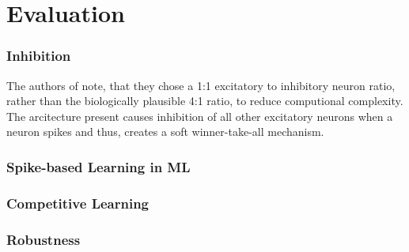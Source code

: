 \section{Evaluation}
\label{sec:evaluation}

\subsubsection{Inhibition}
The authors of \cite{SNN} note, that they chose a 1:1 excitatory to inhibitory neuron ratio, rather than the biologically plausible 4:1 ratio, 
to reduce computional complexity.
The arcitecture present causes inhibition of all other excitatory neurons when a neuron spikes and thus, 
creates a soft winner-take-all mechanism.


\subsubsection{Spike-based Learning in ML}

\subsubsection{Competitive Learning}

\subsubsection{Robustness}